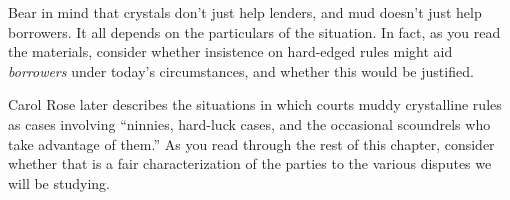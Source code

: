 
\item Bear in mind that crystals don't just help lenders, and mud doesn't just
help borrowers. It all depends on the particulars of the situation.  In fact,
as you read the materials, consider whether insistence on hard-edged rules
might aid \textit{borrowers} under today's circumstances, and whether this
would be justified.  


\item Carol Rose later describes the situations in which courts muddy
crystalline rules as cases involving ``ninnies, hard-luck cases, and the
occasional scoundrels who take advantage of them.'' As you read through the
rest of this chapter, consider whether that is a fair characterization of the
parties to the various disputes we will be studying.

